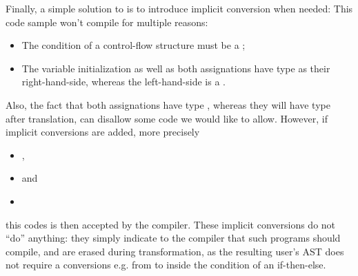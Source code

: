 Finally, a simple solution to  is to introduce implicit conversion when needed:
This code sample won't compile for multiple reasons:
\begin{itemize}
    \item The condition of a control-flow structure must be a ;
    \item The variable initialization as well as both assignations have type  as their right-hand-side, whereas the left-hand-side is a .
\end{itemize}
Also, the fact that both assignations have type , whereas they will have type  after translation, can disallow some code we would like to allow.
However, if implicit conversions are added, more precisely
\begin{itemize}
    \item {},
    \item {} and
    \item {}
\end{itemize}
this codes is then accepted by the compiler.
These implicit conversions do not ``do'' anything:
they simply indicate to the compiler that such programs should compile, and are erased during transformation,
as the resulting user's AST does not require a conversions e.g. from  to \scalasnippet{Boolean]} inside the condition of an if-then-else.
